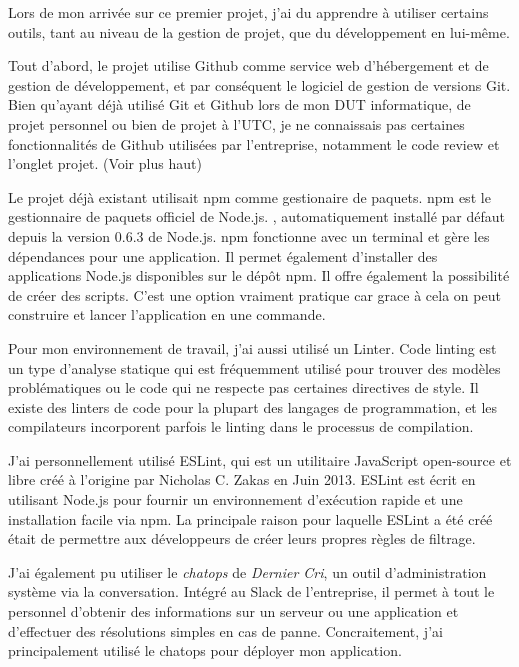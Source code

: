 Lors de mon arrivée sur ce premier projet, j'ai du apprendre à utiliser
certains outils, tant au niveau de la gestion de projet, que du
développement en lui-même.

\bigskip

Tout d'abord, le projet utilise Github comme service web d'hébergement
et de gestion de développement, et par conséquent le logiciel de gestion
de versions Git. Bien qu'ayant déjà utilisé Git et Github lors de mon
DUT informatique, de projet personnel ou bien de projet à l'UTC, je ne
connaissais pas certaines fonctionnalités de Github utilisées par
l'entreprise, notamment le code review et l'onglet projet. (Voir plus
haut)

\bigskip

Le projet déjà existant utilisait npm comme gestionaire de paquets. npm
est le gestionnaire de paquets officiel de Node.js. , automatiquement
installé par défaut depuis la version 0.6.3 de Node.js. npm fonctionne
avec un terminal et gère les dépendances pour une application. Il permet
également d'installer des applications Node.js disponibles sur le dépôt
npm. Il offre également la possibilité de créer des scripts. C'est une
option vraiment pratique car grace à cela on peut construire et lancer
l'application en une commande.

\bigskip

Pour mon environnement de travail, j'ai aussi utilisé un Linter. Code
linting est un type d'analyse statique qui est fréquemment utilisé pour
trouver des modèles problématiques ou le code qui ne respecte pas
certaines directives de style. Il existe des linters de code pour la
plupart des langages de programmation, et les compilateurs incorporent
parfois le linting dans le processus de compilation.

\bigskip

J'ai personnellement utilisé ESLint, qui est un utilitaire JavaScript
open-source et libre créé à l'origine par Nicholas C. Zakas en Juin
2013. ESLint est écrit en utilisant Node.js pour fournir un
environnement d'exécution rapide et une installation facile via npm. La
principale raison pour laquelle ESLint a été créé était de permettre aux
développeurs de créer leurs propres règles de filtrage.

\bigskip

J'ai également pu utiliser le \emph{chatops} de \emph{Dernier Cri}, un
outil d'administration système via la conversation. Intégré au Slack de
l'entreprise, il permet à tout le personnel d'obtenir des informations
sur un serveur ou une application et d'effectuer des résolutions simples
en cas de panne. Concraitement, j'ai principalement utilisé le chatops
pour déployer mon application.

